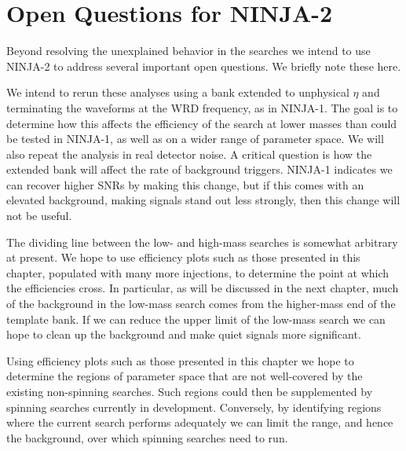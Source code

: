 \section{Open Questions for NINJA-2}

Beyond resolving the unexplained behavior in the searches we intend to
use NINJA-2 to address several important open questions.  We briefly
note these here.


We intend to rerun these analyses using a bank extended to unphysical
$\eta$ and terminating the waveforms at the WRD frequency, as in
NINJA-1.  The goal is to determine how this affects the efficiency of
the search at lower masses than could be tested in NINJA-1, as well as
on a wider range of parameter space.  We will also repeat the analysis
in real detector noise.  A critical question is how the extended bank
will affect the rate of background triggers.  NINJA-1 indicates we can
recover higher SNRs by making this change, but if this comes with an
elevated background, making signals stand out less strongly, then this
change will not be useful.


The dividing line between the low- and high-mass searches is somewhat
arbitrary at present.  We hope to use efficiency plots such as those
presented in this chapter, populated with many more injections, to
determine the point at which the efficiencies cross.  In particular,
as will be discussed in the next chapter, much of the background in
the low-mass search comes from the higher-mass end of the template
bank.  If we can reduce the upper limit of the low-mass search we can
hope to clean up the background and make quiet signals more
significant.


Using efficiency plots such as those presented in this chapter we hope
to determine the regions of parameter space that are not well-covered
by the existing non-spinning searches.  Such regions could then be
supplemented by spinning searches currently in development.
Conversely, by identifying regions where the current search performs
adequately we can limit the range, and hence the background, over
which spinning searches need to run.


